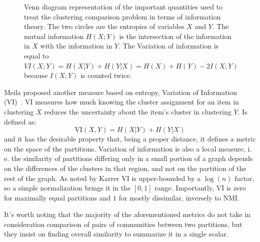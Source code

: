 \begin{figure}
\centering
{}
\caption{Venn diagram representation of the important quantities used to treat the clustering comparison problem in terms of information theory. The two circles are the entropies of variables $X$ and $Y$. The mutual information $H(X;Y)$ is the intersection of the information in $X$ with the information in $Y$. The Variation of information is equal to $VI(X;Y)=H(X|Y)+H(Y|X)=H(X)+H(Y)-2I(X;Y)$ because $I(X;Y)$ is counted twice.}
\end{figure}

Meila proposed another measure based on entropy, Variation of Information (VI)~\cite{meila2007}. VI measures how much knowing the cluster assignment for an item in clustering $X$ reduces the uncertainty about the item's cluster in clustering $Y$. Is defined as:
\begin{equation}\label{eq:vi}
\textrm{VI}(X,Y) = H(X|Y) + H(Y|X)
\end{equation}
and it has the desirable property that, being a proper distance, it defines a metric on the space of the partitions.
Variation of information is also a local measure, i. e. the similarity of partitions differing only in a small portion of a graph depends on the differences of the clusters in that region, and not on the partition of the rest of the graph.
As noted by Karrer \cite{karrer2008} VI is upper-bounded by a $\log(n)$ factor, so a simple normalization brings it in the $[0,1]$ range. 
Importantly, VI is zero for maximally equal partitions and $1$ for mostly dissimilar, inversely to NMI.

It's worth noting that the majority of the aforementioned metrics do not take in consideration comparison of pairs of communities between two partitions, but they insist on finding overall similarity to summarize it in a single scalar.

